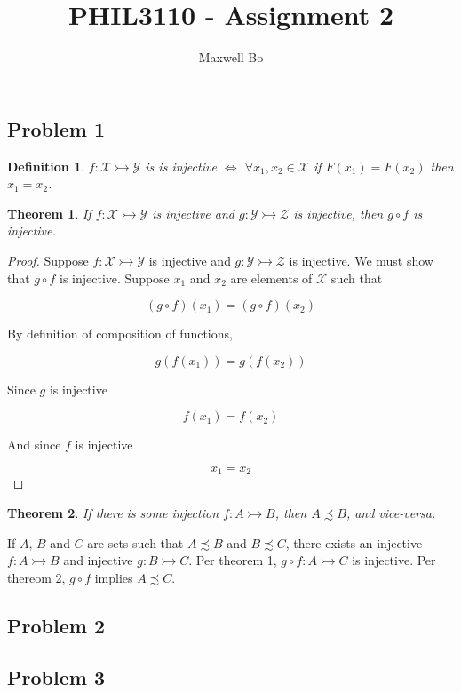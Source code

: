 \documentclass[a4paper]{article}
\title{PHIL3110 - Assignment 2}
\author{Maxwell Bo}
\newtheorem{theorem}{Theorem}
\newtheorem{definition}{Definition}
\newtheorem{proof}{Proof}
\begin{document}
 

\maketitle

\subsection*{Problem 1}

\begin{definition}
$f: \mathcal{X} \rightarrowtail \mathcal{Y}$ is is injective $\Leftrightarrow$ $\forall x_1, x_2 \in \mathcal{X}$ if $F(x_1) = F(x_2)$ then $x_1 = x_2$.
\end{definition}

\begin{theorem}
    If $f: \mathcal{X} \rightarrowtail \mathcal{Y}$ is injective and $g: \mathcal{Y} \rightarrowtail \mathcal{Z}$ is injective, then $g \circ f$ is injective.
\end{theorem}

\begin{proof}
Suppose $f: \mathcal{X} \rightarrowtail \mathcal{Y}$ is injective and $g: \mathcal{Y} \rightarrowtail \mathcal{Z}$ is injective. We must show that $g \circ f$ is injective. Suppose $x_1$ and $x_2$ are elements of $\mathcal{X}$ such that

\[(g \circ f)(x_1) = (g \circ f)(x_2)\]

By definition of composition of functions,

\[g(f(x_1)) = g(f(x_2))\]

Since $g$ is injective

\[f(x_1) = f(x_2)\]

And since $f$ is injective

\[x_1 = x_2\]

\end{proof}

\begin{theorem}
If there is some injection $f: A \rightarrowtail B$, then $A \precsim B$, and vice-versa.
\end{theorem}

If $A$, $B$ and $C$ are sets such that $A \precsim B$ and $B \precsim C$, there exists an injective $f: A \rightarrowtail B$ and injective $g: B \rightarrowtail C$. Per theorem 1, $g \circ f: A \rightarrowtail C$ is injective. Per thereom 2, $g \circ f$ implies $A \precsim C$.

\newpage
\subsection*{Problem 2}



\subsection*{Problem 3}
\end{document}
